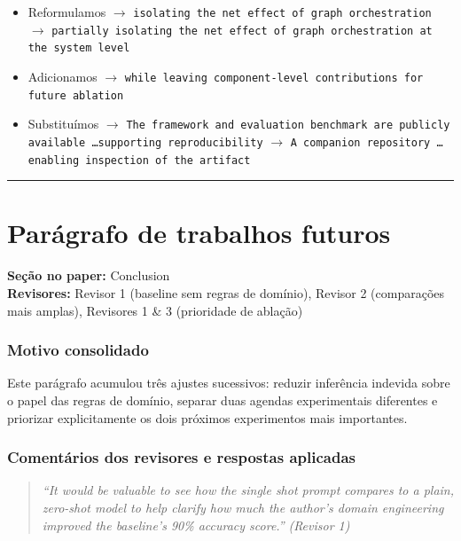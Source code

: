 \documentclass[11pt,a4paper]{article}
\begin{document}
\begin{trackblock}
\begin{itemize}
  \item Reformulamos $\to$ \texttt{isolating the net effect of graph orchestration} $\to$ \texttt{partially isolating the net effect of graph orchestration at the system level}
  \item Adicionamos $\to$ \texttt{while leaving component-level contributions for future ablation}
  \item Substituímos $\to$ \texttt{The framework and evaluation benchmark are publicly available \ldots supporting reproducibility} $\to$ \texttt{A companion repository \ldots enabling inspection of the artifact}
\end{itemize}
\end{trackblock}

\bigskip\hrule\bigskip

\section{Parágrafo de trabalhos futuros}

\textbf{Seção no paper:} Conclusion\\
\textbf{Revisores:} Revisor 1 (baseline sem regras de domínio), Revisor 2 (comparações mais amplas), Revisores 1 \& 3 (prioridade de ablação)

\subsubsection*{Motivo consolidado}

Este parágrafo acumulou três ajustes sucessivos: reduzir inferência indevida sobre o papel das regras de domínio, separar duas agendas experimentais diferentes e priorizar explicitamente os dois próximos experimentos mais importantes.

\subsubsection*{Comentários dos revisores e respostas aplicadas}

\begin{quote}
\textit{``It would be valuable to see how the single shot prompt compares to a plain, zero-shot model to help clarify how much the author's domain engineering improved the baseline's 90\% accuracy score.''}
\hfill\textit{(Revisor 1)}
\end{quote}
\end{document}

